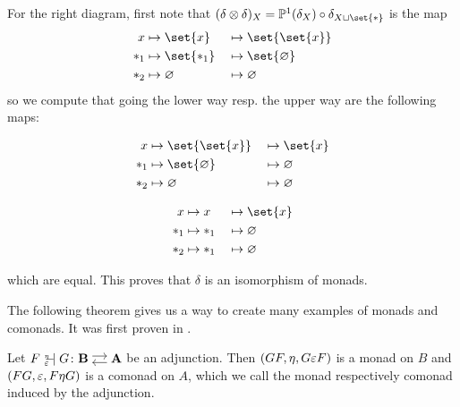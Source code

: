 \begin{example}
    For the right diagram, first note that $(\delta \tensor \delta)_X = \P^1(\delta_X) \circ \delta_{X \sqcup \set{\ast}}$
    is the map
    \begin{alignat*}{2}
        x &\mapsto \set{x} &&\mapsto \set{\set{x}} \\
        \ast_1 &\mapsto \set{\ast_1} &&\mapsto \set{\emptyset} \\
        \ast_2 &\mapsto \emptyset &&\mapsto \emptyset
    \end{alignat*}
    so we compute that going the lower way resp. the upper way are the following maps:
    \begin{figure}[H]
    \vspace{-1.5em}
    \centering
    \begin{subfigure}{0.4\textwidth}
    \centering
    \begin{alignat*}{2}
        x &\mapsto \set{\set{x}} &&\mapsto \set{x} \\
        \ast_1 &\mapsto \set{\emptyset} &&\mapsto \emptyset \\
        \ast_2 &\mapsto \emptyset &&\mapsto \emptyset
    \end{alignat*}
    \end{subfigure}
    \hspace{2em}
    \begin{subfigure}{0.4\textwidth}
    \centering
    \begin{alignat*}{2}
        x &\mapsto x &&\mapsto \set{x} \\
        \ast_1 &\mapsto \ast_1 &&\mapsto \emptyset \\
        \ast_2 &\mapsto \ast_1 &&\mapsto \emptyset
        \end{alignat*}
    \end{subfigure}
    \end{figure}
    which are equal. This proves that $\delta$ is an isomorphism of monads.
\end{example}
The following theorem gives us a way to create many examples of monads and comonads.
It was first proven in \cite{huber}.
\begin{theorem}
    Let $F {\ }_{\eps}^{\text{\tiny{$\eta$}}}\!\!\!\!\adj G \colon \adjar{B}{A}$
    be an adjunction. Then $(GF,\eta,G\varepsilon F)$ is a monad on $B$ and $(FG,\varepsilon,F\eta G)$ is a comonad on $A$, which we
    call the monad respectively comonad induced by the adjunction.
\end{theorem}
